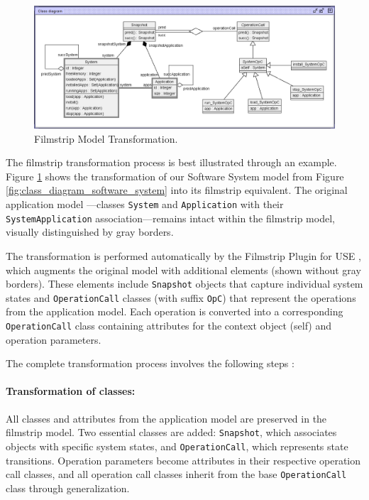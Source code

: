 \begin{figure}
    \centering
    \includegraphics[width=1\textwidth]{figures/c1/SoftwareSystem/SS_Filmstrip_Gray_Edited.png}
    \caption{Filmstrip Model Transformation.}
    \label{fig:filmstrip_model}
\end{figure}

\hspace{1cm} The filmstrip transformation process is best illustrated through an example. 
Figure \ref{fig:filmstrip_model} shows the transformation of our Software System 
model from Figure \ref{fig:class_diagram_software_system} into its filmstrip 
equivalent. The original application model —classes \texttt{System} and 
\texttt{Application} with their \texttt{SystemApplication} association—remains 
intact within the filmstrip model, visually distinguished by gray borders.

The transformation is performed automatically by the Filmstrip Plugin for USE \cite{Filmstripping}, which 
augments the original model with additional elements (shown without gray borders). 
These elements include \texttt{Snapshot} objects that capture individual system 
states and \texttt{OperationCall} classes (with suffix \texttt{OpC}) that represent 
the operations from the application model. Each operation is converted into a 
corresponding \texttt{OperationCall} class containing attributes for the context 
object (self) and operation parameters.

The complete transformation process involves the following steps \cite{Filmstripping}:
\vspace{-1.2em}
\paragraph{Transformation of classes:} All classes and attributes from the 
application model are preserved in the filmstrip model. Two essential classes are 
added: \texttt{Snapshot}, which associates objects with specific system states, 
and \texttt{OperationCall}, which represents state transitions. Operation parameters 
become attributes in their respective operation call classes, and all operation call 
classes inherit from the base \texttt{OperationCall} class through generalization.
\vspace{-1.2em}
